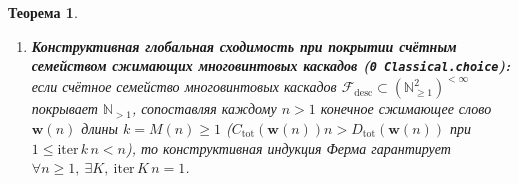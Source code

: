 \documentclass[11pt,a4paper]{article}
\newtheorem{theorem}{Теорема}[section]
\theoremstyle{definition}
\theoremstyle{remark}
\begin{document}
\begin{theorem}
\begin{enumerate}[label=\textbf{(\roman*)},leftmargin=*,noitemsep]
  \[
    \mathcal{D}_{\mathrm{core}}^{(M)} + \mathcal{E}_{\mathrm{core}}^{(M)} \;\equiv\; \bigl(U_M - 3^{B_M}\bigr) q_0, \qquad
    2^{A_M - R_0}(n_0 - n_M) \;\equiv\; \bigl(2^{A_M} - 3^{B_M}\bigr) q_0 - \mathcal{D}_{\mathrm{core}}^{(M)} \;\equiv\; \bigl(2^{A_M} - U_M\bigr) q_0 + \mathcal{E}_{\mathrm{core}}^{(M)},
  \]
  откуда чисто мультипликативное условие $2^{A_M} > U_M$ безусловно влечёт $(2^{A_M} - 3^{B_M}) n_0 > D_{\mathrm{tot}}$ и $n_M < n_0$ при всех $q_0 \ge 1$. В частности, на любом замкнутом цикле $n_M = n_0$ ($q_M = q_0 \ge 1,\ R_M = R_0$) равенства $(2^{A_M} - 3^{B_M}) q_0 = \mathcal{D}_{\mathrm{core}}^{(M)} > 0$ и $(U_M - 2^{A_M}) q_0 = \mathcal{E}_{\mathrm{core}}^{(M)} \ge 0$ исключают $q_0$ через пропорцию $(U_M - 2^{A_M})\mathcal{D}_{\mathrm{core}}^{(M)} \equiv (2^{A_M} - 3^{B_M})\mathcal{E}_{\mathrm{core}}^{(M)}$ и запирают показатели цикла в мультипликативную щель $3^{B_M} < 2^{A_M} \le U_M$, причём $2^{A_M} = U_M \iff \mathcal{E}_{\mathrm{core}}^{(M)} = 0$ ($q_0 = \dots = q_{M-1} = 1$, стационарный корень $n_0 = 1$);
\item \textbf{Конструктивная глобальная сходимость при покрытии счётным семейством сжимающих многовинтовых каскадов (\texttt{0 Classical.choice}):}
  если счётное семейство многовинтовых каскадов $\mathcal{F}_{\mathrm{desc}} \subset (\mathbb{N}_{\ge 1}^2)^{<\infty}$ покрывает $\mathbb{N}_{>1}$, сопоставляя каждому $n > 1$ конечное сжимающее слово $\mathbf{w}(n)$ длины $k = M(n) \ge 1$ ($C_{\mathrm{tot}}(\mathbf{w}(n))n > D_{\mathrm{tot}}(\mathbf{w}(n))$ при $1 \le \mathrm{iter}\,k\,n < n$), то конструктивная индукция Ферма гарантирует $\forall n \ge 1,\ \exists K,\ \mathrm{iter}\,K\,n = 1$.
\end{enumerate}
\end{theorem}
\end{document}
